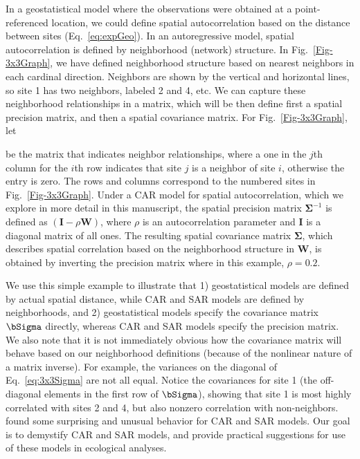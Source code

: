 In a geostatistical model where the observations were obtained at a point-referenced location, we could define spatial autocorrelation based on the distance between sites (Eq.~\ref{eq:expGeo}).  In an autoregressive model, spatial autocorrelation is defined by neighborhood (network) structure.  In Fig.~\ref{Fig-3x3Graph}, we have defined neighborhood structure based on nearest neighbors in each cardinal direction.  Neighbors are shown by the vertical and horizontal lines, so site 1 has two neighbors, labeled 2 and 4, etc.  We can capture these neighborhood relationships in a matrix, which will be then define first a spatial precision matrix, and then a spatial covariance matrix.  For Fig.~\ref{Fig-3x3Graph}, let

be the matrix that indicates neighbor relationships, where a one in the $j$th column for the $i$th row indicates that site $j$ is a neighbor of site $i$, otherwise the entry is zero. The rows and columns correspond to the numbered sites in Fig.~\ref{Fig-3x3Graph}.  Under a CAR model for spatial autocorrelation, which we explore in more detail in this manuscript, the spatial precision matrix $\boldsymbol\Sigma^{-1}$ is defined as $(\mathbf{I}-\rho\mathbf{W})$, where $\rho$ is an autocorrelation parameter and $\mathbf{I}$ is a diagonal matrix of all ones.  The resulting spatial covariance matrix $\boldsymbol\Sigma$, which describes spatial correlation based on the neighborhood structure in $\mathbf{W}$, is obtained by inverting the precision matrix
where in this example, $\rho=0.2$.  

We use this simple example to illustrate that 1) geostatistical models are defined by actual spatial distance, while CAR and SAR models are defined by neighborhoods, and 2) geostatistical models specify the covariance matrix $\bSigma$ directly, whereas CAR and SAR models specify the precision matrix.  We also note that it is not immediately obvious how the covariance matrix will behave based on our neighborhood definitions (because of the nonlinear nature of a matrix inverse).  For example, the variances on the diagonal of Eq.~\ref{eq:3x3Sigma} are not all equal. Notice the covariances for site 1 (the off-diagonal elements in the first row of $\bSigma$), showing that site 1 is most highly correlated with sites 2 and 4, but also nonzero correlation with non-neighbors. \citet{Wall:clos:2004} found some surprising and unusual behavior for CAR and SAR models.  Our goal is to demystify CAR and SAR models, and provide practical suggestions for use of these models in ecological analyses. 


